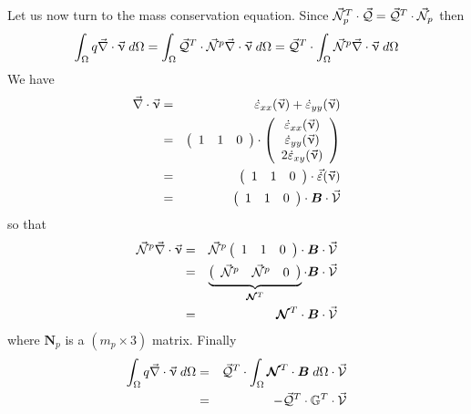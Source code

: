 Let us now turn to the mass conservation equation.
Since $\vec{{\mathcal{N}}}_p^T \cdot \vec{\cal Q}= \vec{\cal Q}^T \cdot \vec{{\mathcal{N}}}_p$ then
\[
\int_\Omega q \vec\nabla \cdot \vec{\upnu} \; d\Omega 
=\int_\Omega \vec{\cal Q}^T \cdot \vec{\cal N}^p \vec\nabla \cdot \vec{\upnu} \; d\Omega  
=\vec{\cal Q}^T \cdot \int_\Omega \vec{\cal N}^p \vec\nabla \cdot \vec{\upnu} \; d\Omega  
\]
We have 
\begin{eqnarray}
\vec\nabla \cdot \vec{\upnu} 
&=&
\dot \varepsilon_{xx}(\vec\upnu) + \dot \varepsilon_{yy}(\vec\upnu) \\
&=& 
\left(
\begin{array}{ccc}
1 & 1  & 0 
\end{array}
\right)
\cdot
\left(
\begin{array}{c}
\dot \varepsilon_{xx}(\vec\upnu) \\
\dot \varepsilon_{yy}(\vec\upnu) \\
2\dot \varepsilon_{xy}(\vec\upnu)
\end{array}
\right) \nonumber\\
&=&
\left(
\begin{array}{ccc}
1 & 1 & 0 
\end{array}
\right)
\cdot
\vec{\dot \varepsilon}(\vec\upnu)  \nonumber\\
&=&
\left(
\begin{array}{ccc}
1 & 1 & 0 
\end{array}
\right)
\cdot
{\bm B} \cdot \vec{\cal V}
\end{eqnarray}
so that
\begin{eqnarray}
\vec{\cal N}^p  \vec\nabla \cdot \vec{\upnu}
&=& \vec{\cal N}^p  
\left(
\begin{array}{ccc}
1 & 1 & 0 
\end{array}
\right)
\cdot
{\bm B} \cdot \vec{\cal V} \nonumber\\
&=&
\underbrace{
\left(
\begin{array}{cccccc}
\vec{\cal N}^p & \vec{\cal N}^p & 0 
\end{array}
\right)
}_{{\bm {{\mathcal{N}}}}^T}
\cdot
{\bm B} \cdot \vec{\cal V} \nonumber\\
&=&
{\bm {{\mathcal{N}}}}^T \cdot {\bm B} \cdot \vec{\cal V}
\end{eqnarray}
where ${\bm N}_p$ is a $(m_p \times 3)$ matrix.
Finally
\begin{eqnarray}
\int_\Omega q \vec\nabla \cdot \vec{\upnu} \; d\Omega 
&=& \vec{\cal Q}^T \cdot \int_\Omega {\bm {{\mathcal{N}}}}^T \cdot {\bm B} \; d\Omega \cdot \vec{\cal V} \nonumber\\
&=& - \vec{\cal Q}^T \cdot \mathbb{G}^T \cdot \vec{\cal V} 
\end{eqnarray}
